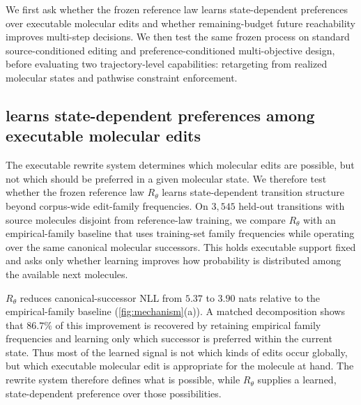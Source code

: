 %
\label{sec:experiments}

We first ask whether the frozen reference law learns state-dependent preferences over executable molecular edits and whether remaining-budget future reachability improves multi-step decisions. We then test the same frozen process on standard source-conditioned editing and preference-conditioned multi-objective design, before evaluating two trajectory-level capabilities: retargeting from realized molecular states and pathwise constraint enforcement.

\subsection{\method{} learns state-dependent preferences among executable molecular edits}
\label{sec:exp-rtheta}

The executable rewrite system determines which molecular edits are possible, but not which should be preferred in a given molecular state. We therefore test whether the frozen reference law $R_\theta$ learns state-dependent transition structure beyond corpus-wide edit-family frequencies. On $3{,}545$ held-out transitions with source molecules disjoint from reference-law training, we compare $R_\theta$ with an empirical-family baseline that uses training-set family frequencies while operating over the same canonical molecular successors. This holds executable support fixed and asks only whether learning improves how probability is distributed among the available next molecules.

$R_\theta$ reduces canonical-successor NLL from $5.37$ to $3.90$ nats relative to the empirical-family baseline (\cref{fig:mechanism}(a)). A matched decomposition shows that $86.7\%$ of this improvement is recovered by retaining empirical family frequencies and learning only which successor is preferred within the current state. Thus most of the learned signal is not which kinds of edits occur globally, but which executable molecular edit is appropriate for the molecule at hand. The rewrite system therefore defines what is possible, while $R_\theta$ supplies a learned, state-dependent preference over those possibilities.

